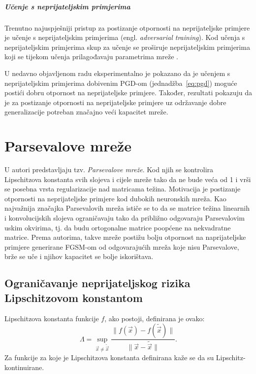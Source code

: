 \documentclass[utf8, seminar, numeric, lmodern]{feri}
\begin{document}
\paragraph{Učenje s neprijateljskim primjerima} Trenutno najuspješniji pristup za postizanje otpornosti na neprijateljske primjere je učenje s neprijateljskim primjerima (engl. \emph{adversarial training}). Kod učenja s neprijateljskim primjerima skup za učenje se proširuje neprijateljskim primjerima koji se tijekom učenja prilagođavaju parametrima mreže \cite{goodfellow14-ehae, kurakin-amls}.

U nedavno objavljenom radu \cite{madry17-tdlmraa} eksperimentalno je pokazano da je učenjem s neprijateljskim primjerima dobivenim PGD-om (jednadžba~\ref{eq:pgd}) moguće postići dobru otpornost na neprijateljske primjere. Također, rezultati pokazuju da je za postizanje otpornosti na neprijateljske primjere uz održavanje dobre generalizacije potreban značajno veći kapacitet mreže.

\chapter{Parsevalove mreže}

U \cite{cisse17-pn} autori predstavljaju tzv. \emph{Parsevalove mreže}. Kod njih se kontrolira Lipschitzova konstanta svih slojeva i cijele mreže tako da ne bude veća od 1 i vrši se posebna vrsta regularizacije nad matricama težina. Motivacija je postizanje otpornosti na neprijateljske primjere kod dubokih neuronskih mreža. Kao najvažnija značajka Parsevalovih mreža ističe se to da se matrice težina linearnih i konvolucijskih slojeva ograničavaju tako da približno odgovaraju Parsevalovim uskim okvirima, tj. da budu ortogonalne matrice poopćene na nekvadratne matrice. Prema autorima, takve mreže postižu bolju otpornost na naprijateljske primjere generirane FGSM-om od odgovarajućih mreža koje nisu Parsevalove, brže se uče i njihov kapacitet se bolje iskorištava.

\section{Ograničavanje neprijateljskog rizika Lipschitzovom konstantom}

Lipschitzova konstanta funkcije $f$, ako postoji, definirana je ovako:
\begin{equation}
\Lambda = \sup_{\vec x\neq \widetilde{\vec x}} \frac{\lVert f(\vec x)-f(\widetilde{\vec x})\rVert}{\lVert \vec x-\widetilde{\vec x}\rVert}.
\end{equation}
Za funkcije za koje je Lipschitzova konstanta definirana kaže se da su Lipschitz-kontinuirane.
\end{document}
